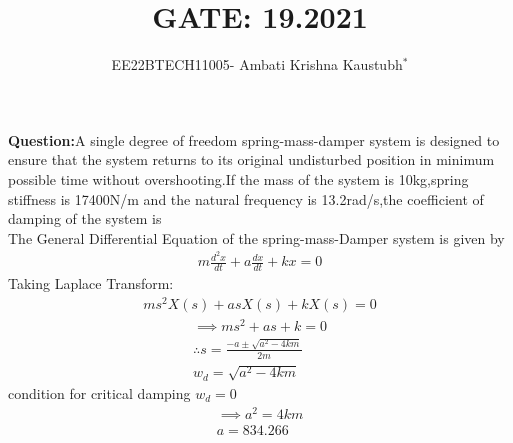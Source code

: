 \documentclass[journal,12pt,twocolumn]{IEEEtran}
\theoremstyle{remark}
\begin{document}

\vspace{3cm}


\title{GATE: 19.2021}
\author{EE22BTECH11005- Ambati Krishna Kaustubh$^{*}$%
}

\maketitle
\newpage
\bigskip

\textbf{Question:}A single degree of freedom spring-mass-damper system is designed to ensure that the system returns to its original undisturbed position in minimum possible time without overshooting.If the mass of the system is 10kg,spring stiffness is 17400N/m and the natural frequency is 13.2rad/s,the coefficient of damping of the system is\\[2pt]

\solution 
The General Differential Equation of the spring-mass-Damper system is given by
\begin{align}
    m\frac{d^2x}{dt}+a\frac{dx}{dt}+kx=0
\end{align}
Taking Laplace Transform:
\begin{align}
    ms^2X(s)+asX(s)+kX(s)=0
\end{align}
\begin{align}
    \implies ms^2+as+k=0\\
    \therefore s=\frac{-a\pm \sqrt{a^2-4km}}{2m}\\
    w_d=\sqrt{a^2-4km}
\end{align}
condition for critical damping $w_d=0$
\begin{align}
    \implies a^2=4km \\
    a=834.266
\end{align}
\end{document}
